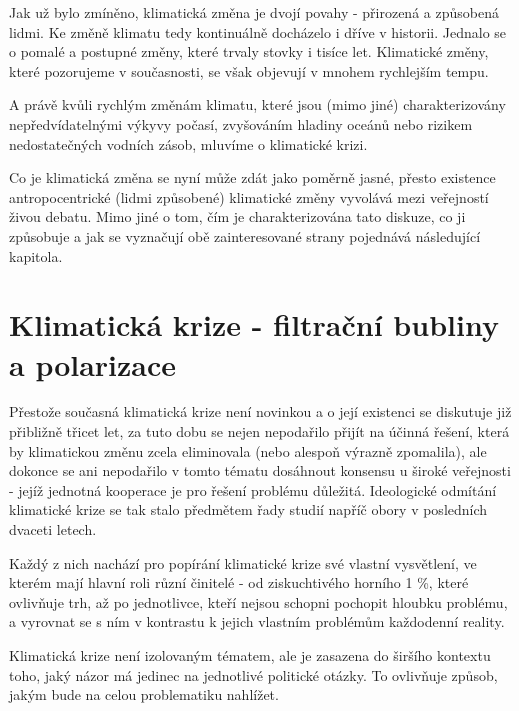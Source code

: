     Jak už bylo zmíněno, klimatická změna je dvojí povahy - přirozená a způsobená lidmi. Ke změně klimatu tedy kontinuálně docházelo i dříve v historii. Jednalo se o pomalé a postupné změny, které trvaly stovky i tisíce let. Klimatické změny, které pozorujeme v současnosti, se však objevují v mnohem rychlejším tempu.~\citep{nationalgeographicsociety_2019}
    
    A právě kvůli rychlým změnám klimatu, které jsou (mimo jiné) charakterizovány nepředvídatelnými výkyvy počasí, zvyšováním hladiny oceánů nebo rizikem nedostatečných vodních zásob, mluvíme o klimatické krizi.~\citep{vitek_2020}
    
    Co je klimatická změna se nyní může zdát jako poměrně jasné, přesto existence antropocentrické (lidmi způsobené) klimatické změny vyvolává mezi veřejností živou debatu. Mimo jiné o tom, čím je charakterizována tato diskuze, co ji způsobuje a jak se vyznačují obě zainteresované strany pojednává následující kapitola.
    
\section{Klimatická krize - filtrační bubliny a polarizace}
\label{sec:klimaticka-krize-bubliny}
    Přestože současná klimatická krize není novinkou a o její existenci se diskutuje již přibližně třicet let, za tuto dobu se nejen nepodařilo přijít na účinná řešení, která by klimatickou změnu zcela eliminovala (nebo alespoň výrazně zpomalila), ale dokonce se ani nepodařilo v tomto tématu dosáhnout konsensu u široké veřejnosti - jejíž jednotná kooperace je pro řešení problému důležitá. Ideologické odmítání klimatické krize se tak stalo předmětem řady studií napříč obory v posledních dvaceti letech.~\citep{almiron2019rethinking}
    
    Každý z nich nachází pro popírání klimatické krize své vlastní vysvětlení, ve kterém mají hlavní roli různí činitelé - od ziskuchtivého horního 1 \%, které ovlivňuje trh, až po jednotlivce, kteří nejsou schopni pochopit hloubku problému, a vyrovnat se s ním v kontrastu k jejich vlastním problémům každodenní reality.~\citep{mathers2020anthropology}
    
    Klimatická krize není izolovaným tématem, ale je zasazena do širšího kontextu toho, jaký názor má jedinec na jednotlivé politické otázky. To ovlivňuje způsob, jakým bude na celou problematiku nahlížet. 
    
